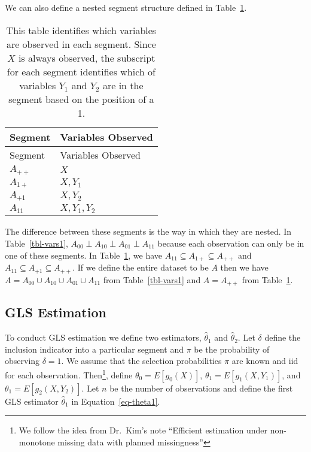 \documentclass[
  letterpaper,
  DIV=11,
  numbers=noendperiod]{scrartcl}
\begin{document}
We can also define a nested segment structure defined in
Table~\ref{tbl-vars2}.

\hypertarget{tbl-vars2}{}
\begin{longtable}[]{@{}ll@{}}
\caption{\label{tbl-vars2}This table identifies which variables are
observed in each segment. Since \(X\) is always observed, the subscript
for each segment identifies which of variables \(Y_1\) and \(Y_2\) are
in the segment based on the position of a 1.}\tabularnewline
\toprule\noalign{}
Segment & Variables Observed \\
\midrule\noalign{}
\endfirsthead
\toprule\noalign{}
Segment & Variables Observed \\
\midrule\noalign{}
\endhead
\bottomrule\noalign{}
\endlastfoot
\(A_{++}\) & \(X\) \\
\(A_{1+}\) & \(X, Y_1\) \\
\(A_{+1}\) & \(X, Y_2\) \\
\(A_{11}\) & \(X, Y_1, Y_2\) \\
\end{longtable}

The difference between these segments is the way in which they are
nested. In Table~\ref{tbl-vars1},
\(A_{00} \perp A_{10} \perp A_{01} \perp A_{11}\) because each
observation can only be in one of these segments. In
Table~\ref{tbl-vars2}, we have
\(A_{11} \subseteq A_{1+} \subseteq A_{++}\) and
\(A_{11} \subseteq A_{+1} \subseteq A_{++}\). If we define the entire
dataset to be \(A\) then we have
\(A = A_{00} \cup A_{10} \cup A_{01} \cup A_{11}\) from
Table~\ref{tbl-vars1} and \(A = A_{++}\) from Table~\ref{tbl-vars2}.

\hypertarget{gls-estimation}{%
\subsection{GLS Estimation}\label{gls-estimation}}

To conduct GLS estimation we define two estimators, \(\hat \theta_1\)
and \(\hat \theta_2\). Let \(\delta\) define the inclusion indicator
into a particular segment and \(\pi\) be the probability of observing
\(\delta = 1\). We assume that the selection probabilities \(\pi\) are
known and iid for each observation. Then\footnote{We follow the idea
  from Dr.~Kim's note ``Efficient estimation under non-monotone missing
  data with planned missingness''}, define \(\theta_0 = E[g_0(X)]\),
\(\theta_1 = E[g_1(X, Y_1)]\), and \(\theta_1 = E[g_2(X, Y_2)]\). Let
\(n\) be the number of observations and define the first GLS estimator
\(\hat \theta_1\) in Equation~\ref{eq-theta1}.
\end{document}
